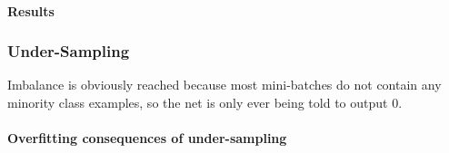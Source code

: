 \documentclass[a4paper,11pt]{article}
\begin{document}
\paragraph{Results}






\subsubsection{Under-Sampling}

Imbalance is obviously reached because most mini-batches do not contain any minority class examples, so the net is only ever being told to output 0. 

%


\paragraph{Overfitting consequences of under-sampling}
\end{document}
